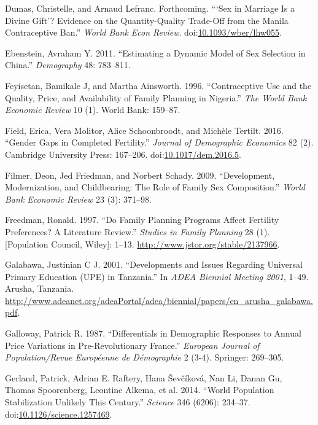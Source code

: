 \documentclass[]{article}
\begin{document}
\hypertarget{ref-Dumas2017}{}
Dumas, Christelle, and Arnaud Lefranc. Forthcoming. ```Sex in Marriage Is a Divine Gift'? Evidence on the Quantity-Quality Trade-Off from the Manila Contraceptive Ban.'' \emph{World Bank Econ Review}. doi:\href{https://doi.org/10.1093/wber/lhw055}{10.1093/wber/lhw055}.

\hypertarget{ref-Ebenstein2011}{}
Ebenstein, Avraham Y. 2011. ``Estimating a Dynamic Model of Sex Selection in China.'' \emph{Demography} 48: 783--811.

\hypertarget{ref-Feyisetan1996}{}
Feyisetan, Bamikale J, and Martha Ainsworth. 1996. ``Contraceptive Use and the Quality, Price, and Availability of Family Planning in Nigeria.'' \emph{The World Bank Economic Review} 10 (1). World Bank: 159--87.

\hypertarget{ref-Field2016}{}
Field, Erica, Vera Molitor, Alice Schoonbroodt, and Michèle Tertilt. 2016. ``Gender Gaps in Completed Fertility.'' \emph{Journal of Demographic Economics} 82 (2). Cambridge University Press: 167--206. doi:\href{https://doi.org/10.1017/dem.2016.5}{10.1017/dem.2016.5}.

\hypertarget{ref-filmer09}{}
Filmer, Deon, Jed Friedman, and Norbert Schady. 2009. ``Development, Modernization, and Childbearing: The Role of Family Sex Composition.'' \emph{World Bank Economic Review} 23 (3): 371--98.

\hypertarget{ref-Freedman1997}{}
Freedman, Ronald. 1997. ``Do Family Planning Programs Affect Fertility Preferences? A Literature Review.'' \emph{Studies in Family Planning} 28 (1). {[}Population Council, Wiley{]}: 1--13. \url{http://www.jstor.org/stable/2137966}.

\hypertarget{ref-Galabawa2001}{}
Galabawa, Justinian C J. 2001. ``Developments and Issues Regarding Universal Primary Education (UPE) in Tanzania.'' In \emph{ADEA Biennial Meeting 2001}, 1--49. Arusha, Tanzania. \url{http://www.adeanet.org/adeaPortal/adea/biennial/papers/en_arusha_galabawa.pdf}.

\hypertarget{ref-Galloway1987}{}
Galloway, Patrick R. 1987. ``Differentials in Demographic Responses to Annual Price Variations in Pre-Revolutionary France.'' \emph{European Journal of Population/Revue Européenne de Démographie} 2 (3-4). Springer: 269--305.

\hypertarget{ref-Gerland2014}{}
Gerland, Patrick, Adrian E. Raftery, Hana Ševčíková, Nan Li, Danan Gu, Thomas Spoorenberg, Leontine Alkema, et al. 2014. ``World Population Stabilization Unlikely This Century.'' \emph{Science} 346 (6206): 234--37. doi:\href{https://doi.org/10.1126/science.1257469}{10.1126/science.1257469}.
\end{document}
